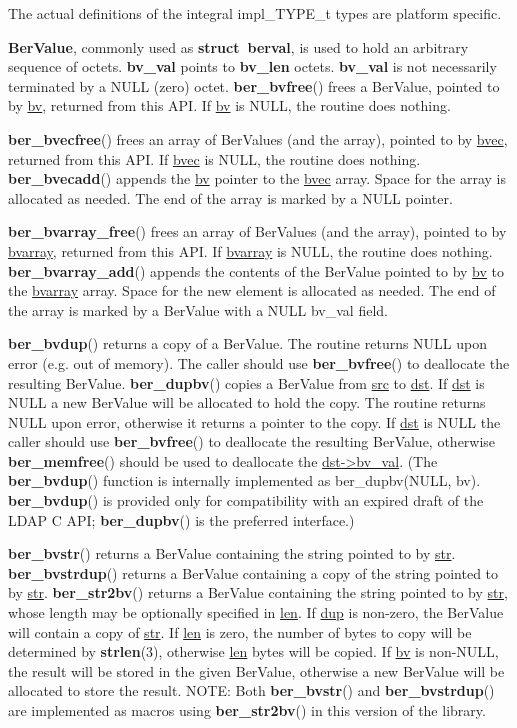 \documentclass[]{article}
\let\realtextbf=\textbf
\renewcommand{\textbf}[1]{\textcolor{boldcolor}{\realtextbf{#1}}}
\renewcommand{\emph}[1]{\underline{#1}}
\begin{document}
The actual definitions of the integral impl\_TYPE\_t types are platform
specific.

\textbf{BerValue}, commonly used as \textbf{struct~berval}, is used to
hold an arbitrary sequence of octets. \textbf{bv\_val} points to
\textbf{bv\_len} octets. \textbf{bv\_val} is not necessarily terminated
by a NULL (zero) octet. \textbf{ber\_bvfree}() frees a BerValue, pointed
to by \emph{bv}, returned from this API. If \emph{bv} is NULL, the
routine does nothing.

\textbf{ber\_bvecfree}() frees an array of BerValues (and the array),
pointed to by \emph{bvec}, returned from this API. If \emph{bvec} is
NULL, the routine does nothing. \textbf{ber\_bvecadd}() appends the
\emph{bv} pointer to the \emph{bvec} array. Space for the array is
allocated as needed. The end of the array is marked by a NULL pointer.

\textbf{ber\_bvarray\_free}() frees an array of BerValues (and the
array), pointed to by \emph{bvarray}, returned from this API. If
\emph{bvarray} is NULL, the routine does nothing.
\textbf{ber\_bvarray\_add}() appends the contents of the BerValue
pointed to by \emph{bv} to the \emph{bvarray} array. Space for the new
element is allocated as needed. The end of the array is marked by a
BerValue with a NULL bv\_val field.

\textbf{ber\_bvdup}() returns a copy of a BerValue. The routine returns
NULL upon error (e.g. out of memory). The caller should use
\textbf{ber\_bvfree}() to deallocate the resulting BerValue.
\textbf{ber\_dupbv}() copies a BerValue from \emph{src} to \emph{dst}.
If \emph{dst} is NULL a new BerValue will be allocated to hold the copy.
The routine returns NULL upon error, otherwise it returns a pointer to
the copy. If \emph{dst} is NULL the caller should use
\textbf{ber\_bvfree}() to deallocate the resulting BerValue, otherwise
\textbf{ber\_memfree}() should be used to deallocate the
\emph{dst-\textgreater{}bv\_val}. (The \textbf{ber\_bvdup}() function is
internally implemented as ber\_dupbv(NULL, bv). \textbf{ber\_bvdup}() is
provided only for compatibility with an expired draft of the LDAP C API;
\textbf{ber\_dupbv}() is the preferred interface.)

\textbf{ber\_bvstr}() returns a BerValue containing the string pointed
to by \emph{str}. \textbf{ber\_bvstrdup}() returns a BerValue containing
a copy of the string pointed to by \emph{str}. \textbf{ber\_str2bv}()
returns a BerValue containing the string pointed to by \emph{str}, whose
length may be optionally specified in \emph{len}. If \emph{dup} is
non-zero, the BerValue will contain a copy of \emph{str}. If \emph{len}
is zero, the number of bytes to copy will be determined by
\textbf{strlen}(3), otherwise \emph{len} bytes will be copied. If
\emph{bv} is non-NULL, the result will be stored in the given BerValue,
otherwise a new BerValue will be allocated to store the result. NOTE:
Both \textbf{ber\_bvstr}() and \textbf{ber\_bvstrdup}() are implemented
as macros using \textbf{ber\_str2bv}() in this version of the library.
\end{document}
